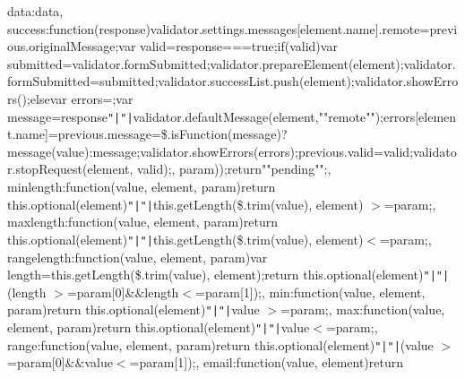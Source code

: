 data\+:data, success\+:function(response)\lcurly{}validator.\+settings.\+messages[element.\+name].\+remote=previous.\+original\+Message;var valid=response===true;if(valid)\lcurly{}var submitted=validator.\+form\+Submitted;validator.\+prepare\+Element(element);validator.\+form\+Submitted=submitted;validator.\+success\+List.\+push(element);validator.\+show\+Errors();\rcurly{}else\lcurly{}var errors=\lcurly{}\rcurly{};var message=response\texttt{"|}\texttt{"|}validator.\+default\+Message(element,""remote"");errors[element.\+name]=previous.\+message=\$.\+is\+Function(message)?message(value)\+:message;validator.\+show\+Errors(errors);\rcurly{}previous.\+valid=valid;validator.\+stop\+Request(element, valid);\rcurly{}\rcurly{}, param));return""pending"";\rcurly{}, minlength\+:function(value, element, param)\lcurly{}return this.\+optional(element)\texttt{"|}\texttt{"|}this.\+get\+Length(\$.\+trim(value), element) $>$=param;\rcurly{}, maxlength\+:function(value, element, param)\lcurly{}return this.\+optional(element)\texttt{"|}\texttt{"|}this.\+get\+Length(\$.\+trim(value), element)$<$=param;\rcurly{}, rangelength\+:function(value, element, param)\lcurly{}var length=this.\+get\+Length(\$.\+trim(value), element);return this.\+optional(element)\texttt{"|}\texttt{"|}(length $>$=param[0]\&\&length$<$=param[1]);\rcurly{}, min\+:function(value, element, param)\lcurly{}return this.\+optional(element)\texttt{"|}\texttt{"|}value $>$=param;\rcurly{}, max\+:function(value, element, param)\lcurly{}return this.\+optional(element)\texttt{"|}\texttt{"|}value$<$=param;\rcurly{}, range\+:function(value, element, param)\lcurly{}return this.\+optional(element)\texttt{"|}\texttt{"|}(value $>$=param[0]\&\&value$<$=param[1]);\rcurly{}, email\+:function(value, element)\lcurly{}return 